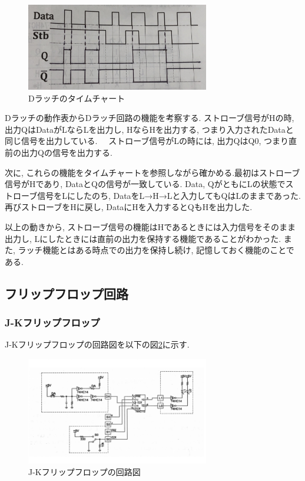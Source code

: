 \documentclass[a4paper, 11pt, uplatex]{jsarticle}
\begin{document}
\begin{figure}[H]
  \begin{center}
    \includegraphics[width = 8cm]{画像/Dラッチタイムチャート.jpg}
    \caption{Dラッチのタイムチャート}
    \label{Dラッチタイムチャート}
  \end{center}
\end{figure}

Dラッチの動作表からDラッチ回路の機能を考察する.
ストローブ信号がHの時,  出力QはDataがLならLを出力し,  HならHを出力する,  つまり入力されたDataと同じ信号を出力している.　
ストローブ信号がLの時には,  出力QはQ0, つまり直前の出力Qの信号を出力する.
\par
次に,  これらの機能をタイムチャートを参照しながら確かめる.最初はストローブ信号がHであり,  DataとQの信号が一致している.
Data, QがともにLの状態でストローブ信号をLにしたのち,  DataをL→H→Lと入力してもQはLのままであった.
再びストローブをHに戻し,  DataにHを入力するとQもHを出力した.

以上の動きから,  ストローブ信号の機能はHであるときには入力信号をそのまま出力し, Lにしたときには直前の出力を保持する機能であることがわかった.
また, ラッチ機能とはある時点での出力を保持し続け, 記憶しておく機能のことである.

\subsection{フリップフロップ回路}
\subsubsection{J-Kフリップフロップ}

J-Kフリップフロップの回路図を以下の図\ref{JK}に示す.

\begin{figure}[H]
  \begin{center}
    \includegraphics[width = 8cm]{画像/JK回路図.png}
    \caption{J-Kフリップフロップの回路図}
    \label{JK}
  \end{center}
\end{figure}
\end{document}
